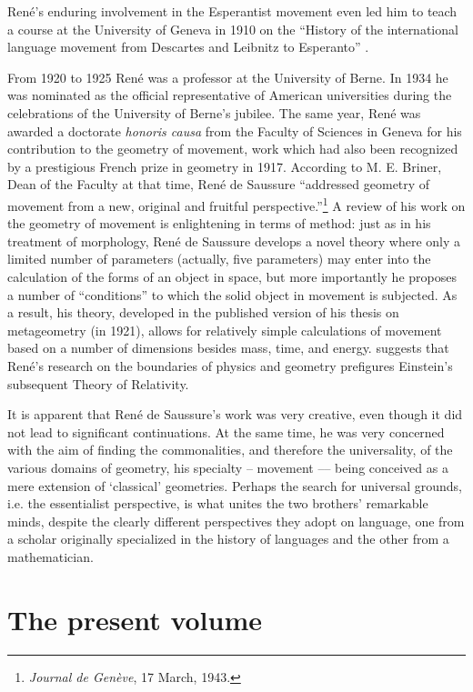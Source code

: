 \begin{refsection}
René’s enduring involvement in the Esperantist movement even led him
to teach a course at the University of Geneva in 1910 on the ``History
of the international language movement from Descartes and Leibnitz to
Esperanto'' .

From 1920 to 1925 René was a professor at the University of Berne. In
1934 he was nominated as the official representative of American
universities during the celebrations of the University of Berne’s
jubilee. The same year, René was awarded a doctorate \emph{honoris
  causa} from the Faculty of Sciences in Geneva for his contribution
to the geometry of movement, work which had also been recognized by a
prestigious French prize in geometry in 1917. According to
M. E. Briner, Dean of the Faculty at that time, René de Saussure
``addressed geometry of movement from a new, original and fruitful
perspective.''\footnote{\textsl{Journal de Genève}, 17 March, 1943.} A
review of his work on the geometry of movement \citep{bricard10:rene}
is enlightening in terms of method: just as in his treatment of
morphology, René de Saussure develops a novel theory where only a
limited number of parameters (actually, five parameters) may enter
into the calculation of the forms of an object in space, but more
importantly he proposes a number of ``conditions'' to which the solid
object in movement is subjected. As a result, his theory, developed in
the published version of his thesis on metageometry (in 1921), allows
for relatively simple calculations of movement based on a number of
dimensions besides mass, time, and energy.
 suggests that René’s research on the
boundaries of physics and geometry prefigures Einstein’s subsequent
Theory of Relativity.

It is apparent that René de Saussure’s work was very creative, even
though it did not lead to significant continuations.  At the same
time, he was very concerned with the aim of finding the commonalities,
and therefore the universality, of the various domains of geometry,
his specialty -- movement --– being conceived as a mere extension of
`classical' geometries. Perhaps the search for universal grounds,
i.e. the essentialist perspective, is what unites the two brothers'
remarkable minds, despite the clearly different perspectives they
adopt on language, one from a scholar originally specialized in the
history of languages and the other from a mathematician.

\section*{The present volume}


\end{refsection}
